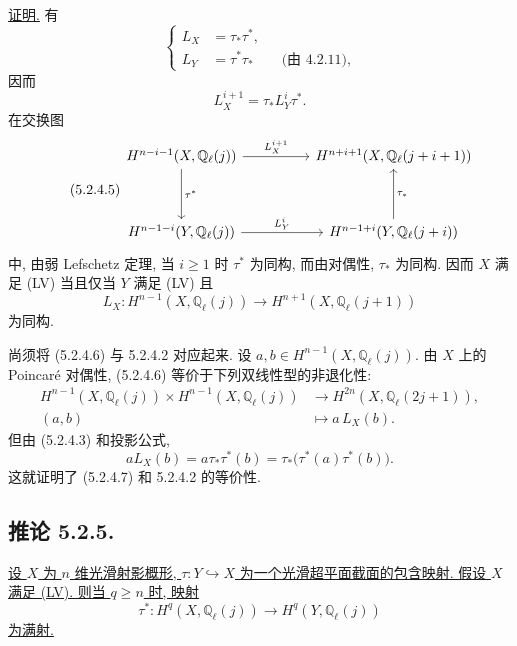 \underline{证明.}
有
\begin{equation}\tag{5.2.4.3}
\left\{
\begin{aligned}
L_X&=\tau_*\tau^*,\\[1ex]
L_Y&=\tau^*\tau_* \qquad\text{(由 4.2.11),}
\end{aligned}
\right.
\end{equation}
因而
\begin{equation}\tag{5.2.4.4}
L_X^{i+1}=\tau_*L_Y^i\tau^*.
\end{equation}
在交换图
\begin{equation}\tag{5.2.4.5}
\begin{tikzcd}[column sep=huge,row sep=huge]
H^{n-i-1}(X,\mathbb Q_\ell(j))
  \arrow[r,"L_X^{i+1}"]\arrow[d,"\tau^*"]
  &H^{n+i+1}(X,\mathbb Q_\ell(j+i+1))\\
H^{n-1-i}(Y,\mathbb Q_\ell(j))
  \arrow[r,"L_Y^i"]
  &H^{n-1+i}(Y,\mathbb Q_\ell(j+i))\arrow[u,"\tau_*"']
\end{tikzcd}
\end{equation}
中, 由弱 Lefschetz 定理, 当 $i\geq1$ 时 $\tau^*$ 为同构, 而由对偶性, $\tau_*$ 为同构. 因而 $X$ 满足 (LV) 当且仅当 $Y$ 满足 (LV) 且
\begin{equation}\tag{5.2.4.6}
L_X:H^{n-1}(X,\mathbb Q_\ell(j))
\longrightarrow H^{n+1}(X,\mathbb Q_\ell(j+1))
\end{equation}
为同构.

尚须将 (5.2.4.6) 与 5.2.4.2 对应起来. 设 $a,b\in H^{n-1}(X,\mathbb Q_\ell(j))$. 由 $X$ 上的 Poincaré 对偶性, (5.2.4.6) 等价于下列双线性型的非退化性:
\begin{equation}\tag{5.2.4.7}
\begin{aligned}
H^{n-1}(X,\mathbb Q_\ell(j))\times
H^{n-1}(X,\mathbb Q_\ell(j))
&\longrightarrow H^{2n}(X,\mathbb Q_\ell(2j+1)),\\
(a,b)&\longmapsto a\,L_X(b).
\end{aligned}
\end{equation}
但由 (5.2.4.3) 和投影公式,
\[
aL_X(b)=a\tau_*\tau^*(b)
=\tau_*\bigl(\tau^*(a)\tau^*(b)\bigr).
\]
这就证明了 (5.2.4.7) 和 5.2.4.2 的等价性.

\subsection*{推论 5.2.5.}
\underline{设 $X$ 为 $n$ 维光滑射影概形, $\tau:Y\hookrightarrow X$ 为一个光滑超平面截面的包含映射. 假设 $X$ 满足 (LV). 则当 $q\geq n$ 时, 映射}
\[
\tau^*:H^q(X,\mathbb Q_\ell(j))
\longrightarrow H^q(Y,\mathbb Q_\ell(j))
\]
\underline{为满射.}

